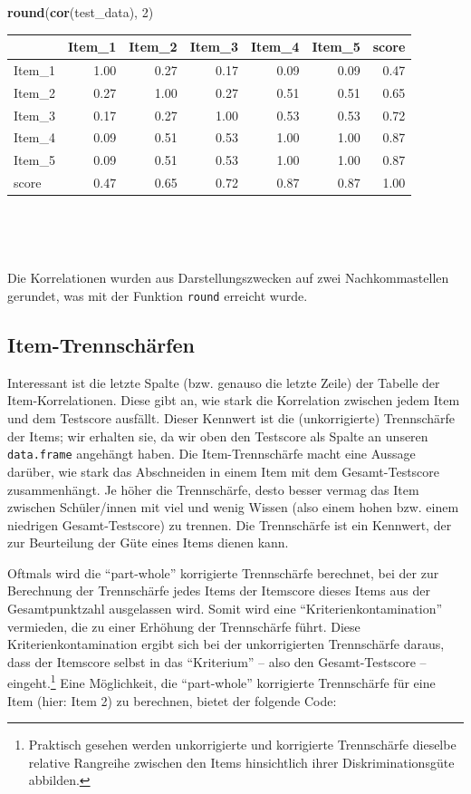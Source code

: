 \documentclass[12pt,]{tufte-book}
\newenvironment{Shaded}{\begin{snugshade}}{\end{snugshade}}
\newcommand{\KeywordTok}[1]{\textcolor[rgb]{0.13,0.29,0.53}{\textbf{#1}}}
\newcommand{\DecValTok}[1]{\textcolor[rgb]{0.00,0.00,0.81}{#1}}
\newcommand{\NormalTok}[1]{#1}
\theoremstyle{definition}
\theoremstyle{definition}
\theoremstyle{definition}
\theoremstyle{remark}
\begin{document}
\begin{Shaded}
\begin{Highlighting}[]
\KeywordTok{round}\NormalTok{(}\KeywordTok{cor}\NormalTok{(test_data), }\DecValTok{2}\NormalTok{)}
\end{Highlighting}
\end{Shaded}

\begin{tabular}{l|r|r|r|r|r|r}
\hline
  & Item\_1 & Item\_2 & Item\_3 & Item\_4 & Item\_5 & score\\
\hline
Item\_1 & 1.00 & 0.27 & 0.17 & 0.09 & 0.09 & 0.47\\
\hline
Item\_2 & 0.27 & 1.00 & 0.27 & 0.51 & 0.51 & 0.65\\
\hline
Item\_3 & 0.17 & 0.27 & 1.00 & 0.53 & 0.53 & 0.72\\
\hline
Item\_4 & 0.09 & 0.51 & 0.53 & 1.00 & 1.00 & 0.87\\
\hline
Item\_5 & 0.09 & 0.51 & 0.53 & 1.00 & 1.00 & 0.87\\
\hline
score & 0.47 & 0.65 & 0.72 & 0.87 & 0.87 & 1.00\\
\hline
\end{tabular}

~

~

Die Korrelationen wurden aus Darstellungszwecken auf zwei
Nachkommastellen gerundet, was mit der Funktion \texttt{round} erreicht
wurde.

\subsection{Item-Trennschärfen}\label{item-trennschuxe4rfen}

Interessant ist die letzte Spalte (bzw. genauso die letzte Zeile) der
Tabelle der Item-Korrelationen. Diese gibt an, wie stark die Korrelation
zwischen jedem Item und dem Testscore ausfällt. Dieser Kennwert ist die
(unkorrigierte) Trennschärfe der Items; wir erhalten sie, da wir oben
den Testscore als Spalte an unseren \texttt{data.frame} angehängt haben.
Die Item-Trennschärfe macht eine Aussage darüber, wie stark das
Abschneiden in einem Item mit dem Gesamt-Testscore zusammenhängt. Je
höher die Trennschärfe, desto besser vermag das Item zwischen
Schüler/innen mit viel und wenig Wissen (also einem hohen bzw. einem
niedrigen Gesamt-Testscore) zu trennen. Die Trennschärfe ist ein
Kennwert, der zur Beurteilung der Güte eines Items dienen kann.

Oftmals wird die ``part-whole'' korrigierte Trennschärfe berechnet, bei
der zur Berechnung der Trennschärfe jedes Items der Itemscore dieses
Items aus der Gesamtpunktzahl ausgelassen wird. Somit wird eine
``Kriterienkontamination'' vermieden, die zu einer Erhöhung der
Trennschärfe führt. Diese Kriterienkontamination ergibt sich bei der
unkorrigierten Trennschärfe daraus, dass der Itemscore selbst in das
``Kriterium'' -- also den Gesamt-Testscore -- eingeht.\footnote{Praktisch
  gesehen werden unkorrigierte und korrigierte Trennschärfe dieselbe
  relative Rangreihe zwischen den Items hinsichtlich ihrer
  Diskriminationsgüte abbilden.} Eine Möglichkeit, die ``part-whole''
korrigierte Trennschärfe für eine Item (hier: Item 2) zu berechnen,
bietet der folgende Code:
\end{document}
